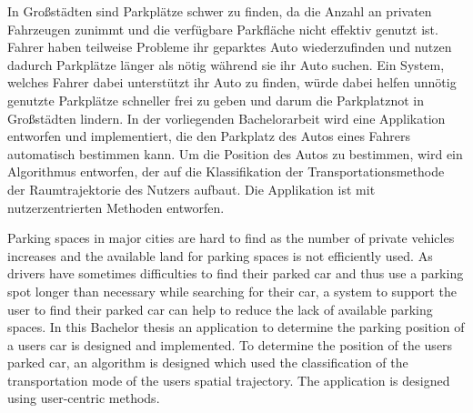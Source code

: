 \begin{abstractDE}

In Großstädten sind Parkplätze schwer zu finden, da die Anzahl an privaten Fahrzeugen zunimmt und die verfügbare Parkfläche nicht effektiv genutzt ist. Fahrer haben teilweise Probleme ihr geparktes Auto wiederzufinden und nutzen dadurch Parkplätze länger als nötig während sie ihr Auto suchen. Ein System, welches Fahrer dabei unterstützt ihr Auto zu finden, würde dabei helfen unnötig genutzte Parkplätze schneller frei zu geben und darum die Parkplatznot in Großstädten lindern. In der vorliegenden Bachelorarbeit wird eine Applikation entworfen und implementiert, die den Parkplatz des Autos eines Fahrers automatisch bestimmen kann. Um die Position des Autos zu bestimmen, wird ein Algorithmus entworfen, der auf die Klassifikation der Transportationsmethode der Raumtrajektorie des Nutzers aufbaut. Die Applikation ist mit nutzerzentrierten Methoden entworfen.

\end{abstractDE}

\vfill

\begin{abstractEN}

Parking spaces in major cities are hard to find as the number of private vehicles increases and the available land for parking spaces is not efficiently used. As drivers have sometimes difficulties to find their parked car and thus use a parking spot longer than necessary while searching for their car, a system to support the user to find their parked car can help to reduce the lack of available parking spaces. In this Bachelor thesis an application to determine the parking position of a users car is designed and implemented. To determine the position of the users parked car, an algorithm is designed which used the classification of the transportation mode of the users spatial trajectory. The application is designed using user-centric methods. 

\end{abstractEN}

\vfill
